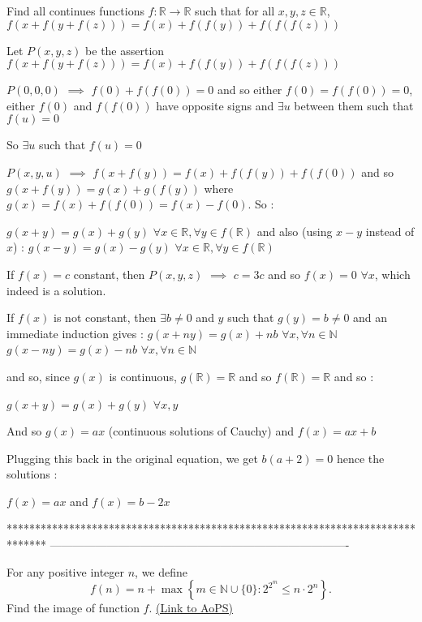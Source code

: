 \begin{solution}
	\begin{tcolorbox}Find all continues functions $ f: \mathbb R\to\mathbb R$ such that for all $ x,y,z\in\mathbb R$,
$ f(x + f(y + f(z))) = f(x) + f(f(y)) + f(f(f(z)))$\end{tcolorbox}

Let $ P(x,y,z)$ be the assertion $ f(x + f(y + f(z))) = f(x) + f(f(y)) + f(f(f(z)))$

$ P(0,0,0)$ $ \implies$ $ f(0) + f(f(0)) = 0$ and so either $ f(0) = f(f(0)) = 0$, either $ f(0)$ and $ f(f(0))$ have opposite signs and $ \exists u$ between them such that $ f(u) = 0$

So $ \exists u$ such that $ f(u) = 0$

$ P(x,y,u)$ $ \implies$ $ f(x + f(y)) = f(x) + f(f(y)) + f(f(0))$ and so $ g(x + f(y)) = g(x) + g(f(y))$ where $ g(x) = f(x) + f(f(0)) = f(x) - f(0)$. So :

$ g(x + y) = g(x) + g(y)$ $ \forall x\in\mathbb R,\forall y\in f(\mathbb R)$ and also (using $ x - y$ instead of $ x$) :
$ g(x - y) = g(x) - g(y)$ $ \forall x\in\mathbb R,\forall y\in f(\mathbb R)$

If $ f(x) = c$ constant, then $ P(x,y,z)$ $ \implies$ $ c = 3c$ and so $ f(x) = 0$ $ \forall x$, which indeed is a solution.

If $ f(x)$ is not constant, then $ \exists b\ne0$ and $ y$ such that $ g(y) = b\ne 0$ and an immediate induction gives :
$ g(x + ny) = g(x) + nb$ $ \forall x,\forall n\in\mathbb N$
$ g(x - ny) = g(x) - nb$ $ \forall x,\forall n\in\mathbb N$

and so, since $ g(x)$ is continuous,  $ g(\mathbb R) = \mathbb R$ and so $ f(\mathbb R) = \mathbb R$ and so :

$ g(x + y) = g(x) + g(y)$ $ \forall x,y$

And so $ g(x) = ax$ (continuous solutions of Cauchy) and $ f(x) = ax + b$

Plugging this back in the original equation, we get $ b(a + 2) = 0$ hence the solutions :

$ \boxed{f(x) = ax}$ and $ \boxed{f(x) = b - 2x}$
\end{solution}
*******************************************************************************
-------------------------------------------------------------------------------

\begin{problem}
	For any positive integer $n$, we define
\[f( n) = n +\max \left\{ m \in \mathbb N \cup \{0\}: 2 ^{2 ^{m}} \leq  n\cdot 2^{n}\right\}.\]
Find the image of function $f$.
	\flushright \href{https://artofproblemsolving.com/community/c6h316308}{(Link to AoPS)}
\end{problem}



